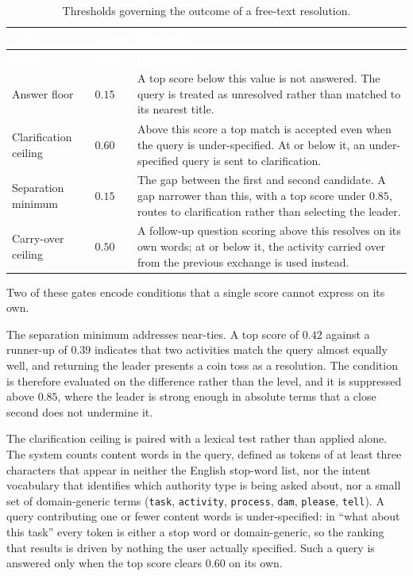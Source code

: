 \begin{longtable}{|p{}|p{}|p{}|}
\caption{Thresholds governing the outcome of a free-text resolution.}\label{tab:thresholds}\\
\hline
\rowcolor{myblue}\textcolor{white}{\textbf{Gate}} & \textcolor{white}{\textbf{Value}} & \textcolor{white}{\textbf{Behaviour}} \\
\hline
\endfirsthead
\hline
\rowcolor{myblue}\textcolor{white}{\textbf{Gate}} & \textcolor{white}{\textbf{Value}} & \textcolor{white}{\textbf{Behaviour}} \\
\hline
\endhead
Answer floor & $0.15$ & A top score below this value is not answered. The query is treated as unresolved rather than matched to its nearest title. \\ \hline
Clarification ceiling & $0.60$ & Above this score a top match is accepted even when the query is under-specified. At or below it, an under-specified query is sent to clarification. \\ \hline
Separation minimum & $0.15$ & The gap between the first and second candidate. A gap narrower than this, with a top score under $0.85$, routes to clarification rather than selecting the leader. \\ \hline
Carry-over ceiling & $0.50$ & A follow-up question scoring above this resolves on its own words; at or below it, the activity carried over from the previous exchange is used instead. \\ \hline
\end{longtable}

Two of these gates encode conditions that a single score cannot express on its own.

The separation minimum addresses near-ties. A top score of $0.42$ against a runner-up of
$0.39$ indicates that two activities match the query almost equally well, and returning the
leader presents a coin toss as a resolution. The condition is therefore evaluated on the
difference rather than the level, and it is suppressed above $0.85$, where the leader is
strong enough in absolute terms that a close second does not undermine it.

The clarification ceiling is paired with a lexical test rather than applied alone. The
system counts content words in the query, defined as tokens of at least three characters
that appear in neither the English stop-word list, nor the intent vocabulary that identifies
which authority type is being asked about, nor a small set of domain-generic terms
(\texttt{task}, \texttt{activity}, \texttt{process}, \texttt{dam}, \texttt{please},
\texttt{tell}). A query contributing one or fewer content words is under-specified: in
``what about this task'' every token is either a stop word or domain-generic, so the ranking
that results is driven by nothing the user actually specified. Such a query is answered only
when the top score clears $0.60$ on its own.

